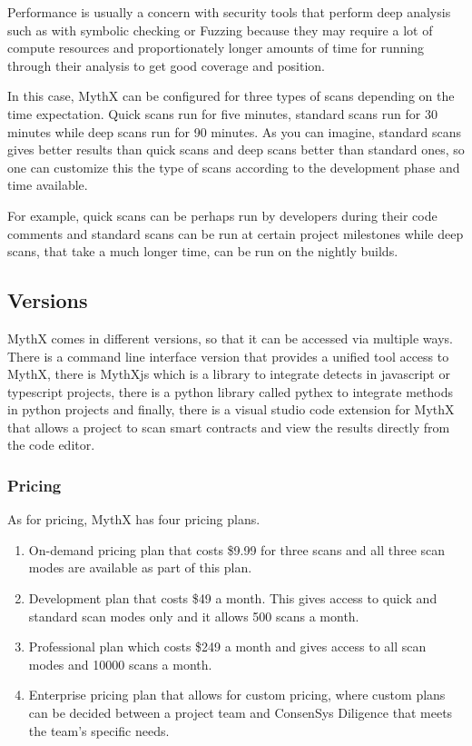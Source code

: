 Performance is usually a concern with security tools that perform deep
analysis such as with symbolic checking or Fuzzing because they may
require a lot of compute resources and proportionately longer amounts of
time for running through their analysis to get good coverage and
position.

In this case, MythX can be configured for three types of scans depending
on the time expectation. Quick scans run for five minutes, standard
scans run for 30 minutes while deep scans run for 90 minutes. As you can
imagine, standard scans gives better results than quick scans and deep
scans better than standard ones, so one can customize this the type of
scans according to the development phase and time available.

For example, quick scans can be perhaps run by developers during their
code comments and standard scans can be run at certain project
milestones while deep scans, that take a much longer time, can be run on
the nightly builds.

\subsection{Versions}\label{versions}

MythX comes in different versions, so that it can be accessed via
multiple ways. There is a command line interface version that provides a
unified tool access to MythX, there is MythXjs which is a library to
integrate detects in javascript or typescript projects, there is a
python library called pythex to integrate methods in python projects and
finally, there is a visual studio code extension for MythX that allows a
project to scan smart contracts and view the results directly from the
code editor.

\subsubsection{Pricing}\label{pricing}

As for pricing, MythX has four pricing plans.

\begin{enumerate}
\def\labelenumi{\arabic{enumi}.}
\tightlist
\item
  On-demand pricing plan that costs \$9.99 for three scans and all three
  scan modes are available as part of this plan.
\item
  Development plan that costs \$49 a month. This gives access to quick
  and standard scan modes only and it allows 500 scans a month.
\item
  Professional plan which costs \$249 a month and gives access to all
  scan modes and 10000 scans a month.
\item
  Enterprise pricing plan that allows for custom pricing, where custom
  plans can be decided between a project team and ConsenSys Diligence
  that meets the team's specific needs.
\end{enumerate}

